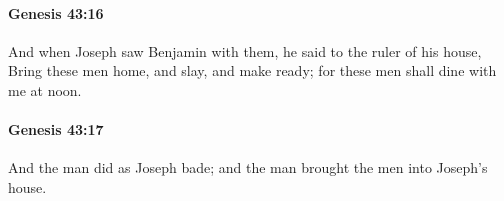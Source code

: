 		\paragraph{Genesis 43:16} %
			\label{GENESIS-43-16}

			And when Joseph saw Benjamin with them, he said to the ruler of his house, Bring these men home, and slay, and make ready; for these men shall dine with me at noon.


		\paragraph{Genesis 43:17} %
			\label{GENESIS-43-17}

			And the man did as Joseph bade; and the man brought the men into Joseph's house.


